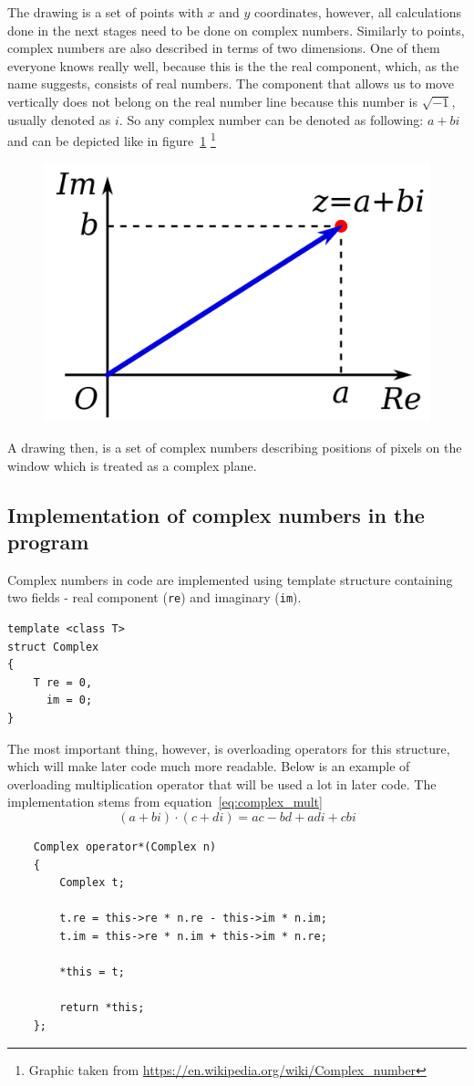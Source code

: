 \documentclass[titlepage]{article}
\begin{document}
    The drawing is a set of points with $x$ and $y$ coordinates, however, all 
    calculations done in the next stages need to be done on complex numbers.
    Similarly to points, complex numbers are also described in terms of
    two dimensions. One of them everyone knows really well, because this is the 
    the real component, which, as the name suggests, consists of real numbers.
    The component that allows us to move vertically does not belong on the real 
    number line because this number is $\sqrt{-1}$, usually denoted as $i$. So
    any complex number can be denoted as following: $a + bi$ and can be depicted
    like in figure~\ref{fig:complex_number}
    \footnote{Graphic taken from \url{https://en.wikipedia.org/wiki/Complex_number}}
    \begin{figure}[H]
        \caption{}
        \centering
        \includegraphics[width=0.3\linewidth]{imaginary_number}
        \label{fig:complex_number}
    \end{figure}
    A drawing then, is a set of complex numbers describing positions of pixels on
    the window which is treated as a complex plane.

\subsection{Implementation of complex numbers in the program}

    Complex numbers in code are implemented using template structure 
    containing two fields - real component (\texttt{re}) and imaginary (\texttt{im}).
    \begin{verbatim}
template <class T>
struct Complex
{
    T re = 0, 
      im = 0;
}
    \end{verbatim}
    The most important thing, however, is overloading operators for this structure,
    which will make later code much more readable. Below is an example of overloading
    multiplication operator that will be used a lot in later code. The implementation
    stems from equation~\eqref{eq:complex_mult}
    \begin{equation}\label{eq:complex_mult}
        (a + bi) \cdot (c + di) = ac - bd + adi + cbi 
    \end{equation}
    \begin{verbatim}
    Complex operator*(Complex n)
    {
        Complex t;

        t.re = this->re * n.re - this->im * n.im;
        t.im = this->re * n.im + this->im * n.re;

        *this = t;

        return *this;
    };
    \end{verbatim}
\end{document}
